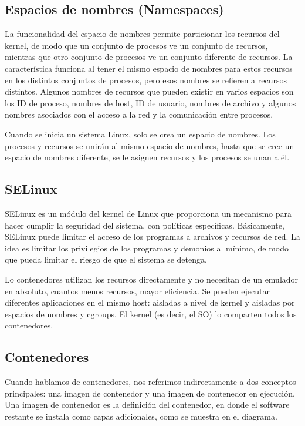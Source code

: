 \subsection*{Espacios de nombres (Namespaces)}
La funcionalidad del espacio de nombres permite particionar los recursos del kernel, 
de modo que un conjunto de procesos ve un conjunto de recursos, mientras que otro 
conjunto de procesos ve un conjunto diferente de recursos. La característica funciona 
al tener el mismo espacio de nombres para estos recursos en los distintos conjuntos 
de procesos, pero esos nombres se refieren a recursos distintos. Algunos nombres 
de recursos que pueden existir en varios espacios son los ID de proceso, nombres 
de host, ID de usuario, nombres de archivo y algunos nombres asociados con el 
acceso a la red y la comunicación entre procesos. 

Cuando se inicia un sistema 
Linux, solo se crea un espacio de nombres. Los procesos y recursos se unirán 
al mismo espacio de nombres, hasta que se cree un espacio de nombres diferente, 
se le asignen recursos y los procesos se unan a él.

\subsection*{SELinux}
SELinux es un módulo del kernel de Linux que proporciona un mecanismo para hacer 
cumplir la seguridad del sistema, con políticas específicas. Básicamente, SELinux 
puede limitar el acceso de los programas a archivos y recursos de red. La idea es 
limitar los privilegios de los programas y demonios al mínimo, de modo que pueda 
limitar el riesgo de que el sistema se detenga.

Lo contenedores utilizan los recursos directamente y no necesitan de un emulador en 
absoluto, cuantos menos recursos, mayor eficiencia. Se pueden ejecutar diferentes 
aplicaciones en el mismo host: aisladas a nivel de kernel y aisladas por 
espacios de nombres y cgroups. El kernel (es decir, el SO) lo comparten todos 
los contenedores.

\subsection*{Contenedores}
Cuando hablamos de contenedores, nos referimos indirectamente a dos conceptos 
principales: una imagen de contenedor y una imagen de contenedor en ejecución. 
Una imagen de contenedor es la definición del contenedor, en donde el software 
restante se instala como capas adicionales, como se muestra en el diagrama.

